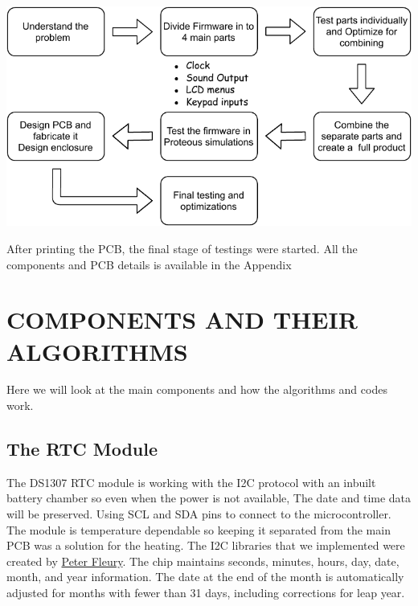 \begin{minipage}{0.97\textwidth}
\centering

\includegraphics[width=\textwidth]{step.pdf}
\end{minipage}

After printing the PCB, the final stage of testings were started. All the components and PCB details is available in the Appendix

\section{COMPONENTS AND THEIR ALGORITHMS}

Here we will look at the main components and how the algorithms and codes work.

\subsection{The RTC Module}

The DS1307 RTC module is working with the I2C protocol with an inbuilt battery chamber so even when the power is not available, The date and time data will be preserved. Using SCL and SDA pins to connect to the microcontroller. The module is temperature dependable so keeping it separated from the main PCB was a solution for the heating. The I2C libraries that we implemented were created by \href{http://jump.to/fleury}{Peter Fleury}. The chip maintains seconds, minutes, hours, day, date, month, and year information. The date at the end of the month is automatically adjusted for months with fewer than 31 days, including corrections for leap year.

